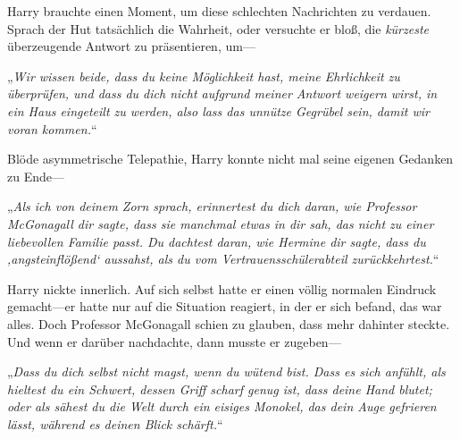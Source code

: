Harry brauchte einen Moment, um diese schlechten Nachrichten zu verdauen. Sprach der Hut tatsächlich die Wahrheit, oder versuchte er bloß, die \emph{kürzeste} überzeugende Antwort zu präsentieren, um—

„\emph{Wir wissen beide, dass du keine Möglichkeit hast, meine Ehrlichkeit zu überprüfen, und dass du dich nicht aufgrund meiner Antwort weigern wirst, in ein Haus eingeteilt zu werden, also lass das unnütze Gegrübel sein, damit wir voran kommen.}“

Blöde asymmetrische Telepathie, Harry konnte nicht mal seine eigenen Gedanken zu Ende—

„\emph{Als ich von deinem Zorn sprach, erinnertest du dich daran, wie Professor McGonagall dir sagte, dass sie manchmal etwas in dir sah, das nicht zu einer liebevollen Familie passt. Du dachtest daran, wie Hermine dir sagte, dass du ‚angsteinflößend‘ aussahst, als du vom Vertrauensschülerabteil zurückkehrtest.}“

Harry nickte innerlich. Auf sich selbst hatte er einen völlig normalen Eindruck gemacht—er hatte nur auf die Situation reagiert, in der er sich befand, das war alles. Doch Professor McGonagall schien zu glauben, dass mehr dahinter steckte. Und wenn er darüber nachdachte, dann musste er zugeben—

„\emph{Dass du dich selbst nicht magst, wenn du wütend bist. Dass es sich anfühlt, als hieltest du ein Schwert, dessen Griff scharf genug ist, dass deine Hand blutet; oder als sähest du die Welt durch ein eisiges Monokel, das dein Auge gefrieren lässt, während es deinen Blick schärft.}“

